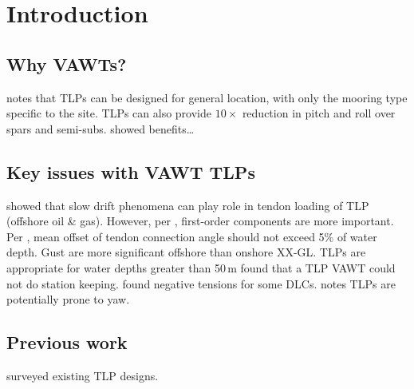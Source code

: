 \documentclass[12pt]{article}
\begin{document}
\maketitle


\section{Introduction}

\subsection{Why VAWTs?}\label{sub:why_vawts_}

\citet{Arshad2013}

\citet{Henderson2010} notes that TLPs can be designed for general location, with only the mooring type specific to the site.
TLPs can also provide $10\times$ reduction in pitch and roll over spars and semi-subs.
\citet{Paquette2012} showed benefits\dots{}


\subsection{Key issues with VAWT TLPs}\label{sub:key_issues_with_vawt_tlps}

\citet{Arshad2013}

\citet{Winterstein1994} showed that slow drift phenomena can play role in tendon loading of TLP (offshore oil \& gas).
However, per \citet{Chakrabarti2005}, first-order components are more important.
Per \citet{Chakrabarti2005}, mean offset of tendon connection angle should not exceed 5\% of water depth.
Gust are more significant offshore than onshore XX-GL.
TLPs are appropriate for water depths greater than 50\,m
\citet{Borg2014} found that a TLP VAWT could not do station keeping.
\citet{Cheng2015} found negative tensions for some DLCs.
\citet{Henderson2010} notes TLPs are potentially prone to yaw.

\subsection{Previous work}\label{sub:previous_work}

\citet{Bachynski2012} surveyed existing TLP designs.
\end{document}
